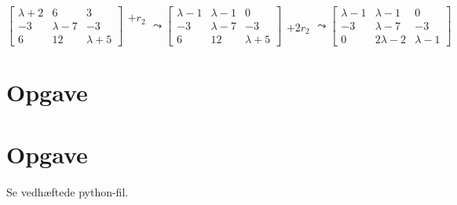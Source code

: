 \documentclass[a4paper,12pt]{article}
\begin{document}
$
\left[\begin{array}{ccc}
    \lambda+2 & 6 & 3\\
    -3 & \lambda-7 & -3 \\
    6 & 12 & \lambda+5
\end{array}\right]
\begin{array}{ccc}
    +r_2\\
    \\
    \\
\end{array}
\leadsto
\left[\begin{array}{ccc}
    \lambda-1 & \lambda - 1 & 0\\
    -3 & \lambda-7 & -3 \\
    6 & 12 & \lambda+5
\end{array}\right]
\begin{array}{ccc}
    \\
    \\
    +2r_2\\
\end{array}
\leadsto
\left[\begin{array}{ccc}
    \lambda-1 & \lambda - 1 & 0\\
    -3 & \lambda-7 & -3 \\
    0 & 2\lambda -2 & \lambda-1
\end{array}\right]
$\\

\subsection{}


\subsection{}


\subsection{}


\subsection{}



\section[Opgave]{Opgave}
\subsection{}


\subsection{}


\subsection{}


\section[Opgave]{Opgave}
Se vedhæftede python-fil.
\end{document}
